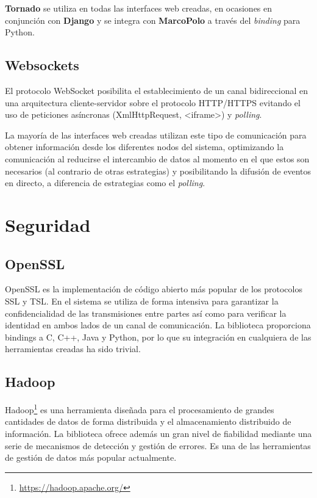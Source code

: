 \textbf{Tornado} se utiliza en todas las interfaces web creadas, en ocasiones en conjunción con \textbf{Django} y se integra con \textbf{MarcoPolo} a través del \textit{binding} para Python.

\subsection{Websockets}

El protocolo WebSocket \cite{rfc6455} posibilita el establecimiento de un canal bidireccional en una arquitectura cliente-servidor sobre el protocolo HTTP/HTTPS evitando el uso de peticiones asíncronas (XmlHttpRequest, <iframe>) y \textit{polling}.

La mayoría de las interfaces web creadas utilizan este tipo de comunicación para obtener información desde los diferentes nodos del sistema, optimizando la comunicación al reducirse el intercambio de datos al momento en el que estos son necesarios (al contrario de otras estrategias) y posibilitando la difusión de eventos en directo, a diferencia de estrategias como el \textit{polling}.

\section{Seguridad}

\subsection{OpenSSL}

OpenSSL es la implementación de código abierto más popular de los protocolos SSL y TSL. En el sistema se utiliza de forma intensiva para garantizar la confidencialidad de las transmisiones entre partes así como para verificar la identidad en ambos lados de un canal de comunicación. La biblioteca proporciona bindings a C, C++, Java y Python, por lo que su integración en cualquiera de las herramientas creadas ha sido trivial. 


\subsection{Hadoop}

Hadoop\footnote{\href{https://hadoop.apache.org/}{https://hadoop.apache.org/}} es una herramienta diseñada para el procesamiento de grandes cantidades de datos de forma distribuida y el almacenamiento distribuido de información. La biblioteca ofrece además un gran nivel de fiabilidad mediante una serie de mecanismos de detección y gestión de errores. Es una de las herramientas de gestión de datos más popular actualmente.

